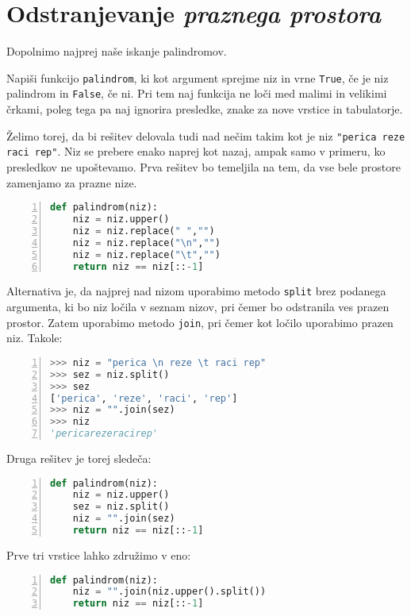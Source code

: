 \section{Odstranjevanje \emph{praznega prostora}}

Dopolnimo najprej naše iskanje palindromov.
\begin{zgled}
Napiši funkcijo \texttt{palindrom}, ki kot argument sprejme niz in vrne \texttt{True}, če je niz palindrom in \texttt{False}, če ni. Pri tem naj funkcija ne loči med malimi in velikimi črkami, poleg tega pa naj ignorira presledke, znake za nove vrstice in tabulatorje.
\end{zgled}

\begin{resitev}
Želimo torej, da bi rešitev delovala tudi nad nečim takim kot je niz \texttt{"perica reze raci rep"}. Niz se prebere enako naprej kot nazaj, ampak samo v primeru, ko presledkov ne upoštevamo. Prva rešitev bo temeljila na tem, da vse bele prostore zamenjamo za prazne nize.
\begin{lstlisting}[language=Python, showstringspaces=false,numbers=left]
def palindrom(niz):
    niz = niz.upper()
    niz = niz.replace(" ","")
    niz = niz.replace("\n","")
    niz = niz.replace("\t","")
    return niz == niz[::-1]
\end{lstlisting}
Alternativa je, da najprej nad nizom uporabimo metodo \texttt{split} brez podanega argumenta, ki bo niz ločila v seznam nizov, pri čemer bo odstranila ves prazen prostor. Zatem uporabimo metodo \texttt{join}, pri čemer kot ločilo uporabimo prazen niz. Takole:
\begin{lstlisting}[language=Python, showstringspaces=false,numbers=left]
>>> niz = "perica \n reze \t raci rep"
>>> sez = niz.split()
>>> sez
['perica', 'reze', 'raci', 'rep']
>>> niz = "".join(sez)
>>> niz
'pericarezeracirep'
\end{lstlisting}
Druga rešitev je torej sledeča:
\begin{lstlisting}[language=Python, showstringspaces=false,numbers=left]
def palindrom(niz):
    niz = niz.upper()
    sez = niz.split()
    niz = "".join(sez)
    return niz == niz[::-1]
\end{lstlisting}
Prve tri vrstice lahko združimo v eno:
\begin{lstlisting}[language=Python, showstringspaces=false,numbers=left]
def palindrom(niz):
    niz = "".join(niz.upper().split())
    return niz == niz[::-1]
\end{lstlisting}
\end{resitev}

